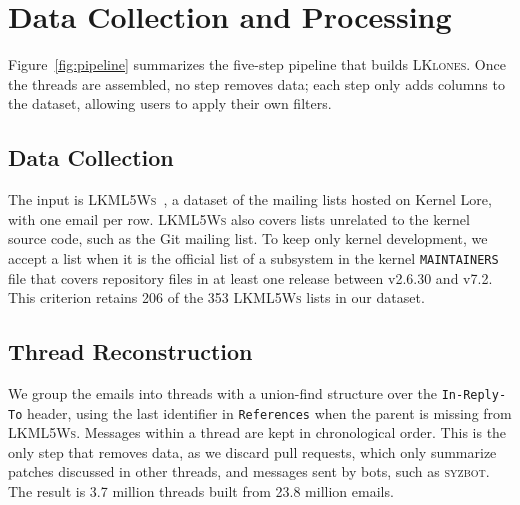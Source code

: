 \documentclass[10pt,conference]{IEEEtran}
\begin{document}
\section{Data Collection and Processing}

Figure~\ref{fig:pipeline} summarizes the five-step pipeline that builds \textsc{LKlones}. Once the threads are assembled, no step removes data; each step only adds columns to the dataset, allowing users to apply their own filters.

%

\subsection{Data Collection}

The input is \textsc{LKML5Ws}~\cite{passos2026lkml5ws}, a dataset of the mailing lists hosted on Kernel Lore, with one email per row. \textsc{LKML5Ws} also covers lists unrelated to the kernel source code, such as the Git mailing list. To keep only kernel development, we accept a list when it is the official list of a subsystem in the kernel \texttt{MAINTAINERS} file that covers repository files in at least one release between v2.6.30 and v7.2. This criterion retains 206 of the 353 \textsc{LKML5Ws} lists in our dataset.

\subsection{Thread Reconstruction}

We group the emails into threads with a union-find structure over the \texttt{In-Reply-To} header, using the last identifier in \texttt{References} when the parent is missing from \textsc{LKML5Ws}. Messages within a thread are kept in chronological order. This is the only step that removes data, as we discard pull requests, which only summarize patches discussed in other threads, and messages sent by bots, such as \textsc{syzbot}\cite{syzbot}. The result is 3.7 million threads built from 23.8 million emails.
\end{document}
